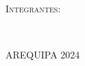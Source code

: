 \documentclass[oneside,letterpaper]{article}            %
\newcommand{\itemStudentA}{Huayhua Hillpa Yourdyy Yossimar}
\newcommand{\itemStudentB}{Participante Nombre Apellido 2}
\newcommand{\itemStudentC}{Participante Nombre Apellido 3}
\newcommand{\itemStudentD}{Participante Nombre Apellido 4}
\newcommand{\itemStudentE}{Participante Nombre Apellido 5}
\begin{document}
\begin{titlepage}
    \vspace{0.25cm}
    \begin{flushleft}
    \textsc{ Integrantes:}\vspace{0.2cm}
    \end{flushleft}
    
    \begin{multicols}{2}
        \begin{flushleft}
            \begin{spacing}{1.6}
                \hspace{1.7cm}{\small $\bullet$ \itemStudentA}\\
            \end{spacing}
        \end{flushleft}
    \end{multicols}
    \vspace{1cm}
    AREQUIPA 2024
\end{titlepage}
     
    
\end{document}
